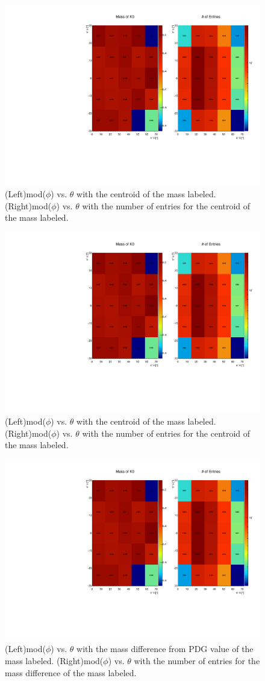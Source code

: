 	\begin{figure}[h]
		\centering
			\includegraphics[page=1,width=.45\textwidth,rotate=-90]{MK_Response/PLOTS_FOR_56669/K0_OnePhi_C2.pdf} 
		\caption{(Left)\pip mod($\phi$) vs. $\theta$ with the centroid of the \Ks mass labeled. (Right)\pip mod($\phi$) vs. $\theta$ with the number of entries for the centroid of the \Ks mass labeled.}
		\label{fig:Test}
	\end{figure}
		\begin{figure}[h]
			\centering
				\includegraphics[page=2,width=.45\textwidth,rotate=-90]{MK_Response/PLOTS_FOR_56669/K0_OnePhi_C2.pdf} 
		\caption{(Left)\pim mod($\phi$) vs. $\theta$ with the centroid of the \Ks mass labeled. (Right)\pim mod($\phi$) vs. $\theta$ with the number of entries for the centroid of the \Ks mass labeled.}
			\label{fig:TestII}
		\end{figure}
	\begin{figure}[h]
		\centering
		\includegraphics[page=3,width=.45\textwidth,rotate=-90]{MK_Response/PLOTS_FOR_56669/K0_OnePhi_C2.pdf} 
		\caption{(Left)\pip mod($\phi$) vs. $\theta$ with the mass difference from PDG value of the \Ks mass labeled. (Right)\pip mod($\phi$) vs. $\theta$ with the number of entries for the mass difference of the \Ks mass labeled.}
		\label{fig:TestIII}
	\end{figure}
